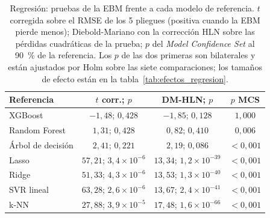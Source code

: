 \begin{table}[tbp]
  \centering\small\setlength{\tabcolsep}{3pt}
  \caption{Regresión: pruebas de la EBM frente a cada modelo de referencia. $t$ corregida sobre el RMSE de los 5 pliegues (positiva cuando la EBM pierde menos); Diebold-Mariano con la corrección HLN sobre las pérdidas cuadráticas de la prueba; $p$ del \emph{Model Confidence Set} al 90~\% de la referencia. Los $p$ de las dos primeras son bilaterales y están ajustados por Holm sobre las siete comparaciones; los tamaños de efecto están en la tabla~\ref{tab:efectos_regresion}.}
  \label{tab:pruebas_regresion}
  \begin{tabular}{@{}l c c c@{}}
    \toprule
    Referencia & $t$ corr.; $p$ & DM-HLN; $p$ & $p$ MCS \\
    \midrule
    XGBoost & $-1{,}48$; $0{,}428$ & $-1{,}85$; $0{,}128$ & $1{,}000$ \\
    Random Forest & $1{,}31$; $0{,}428$ & $0{,}82$; $0{,}410$ & $0{,}006$ \\
    Árbol de decisión & $2{,}41$; $0{,}221$ & $2{,}19$; $0{,}086$ & $<0{,}001$ \\
    Lasso & $57{,}21$; $3{,}4 \times 10^{-6}$ & $13{,}34$; $1{,}2 \times 10^{-39}$ & $<0{,}001$ \\
    Ridge & $51{,}33$; $4{,}3 \times 10^{-6}$ & $13{,}53$; $1{,}3 \times 10^{-40}$ & $<0{,}001$ \\
    SVR lineal & $63{,}28$; $2{,}6 \times 10^{-6}$ & $13{,}67$; $2{,}4 \times 10^{-41}$ & $<0{,}001$ \\
    k-NN & $27{,}88$; $3{,}9 \times 10^{-5}$ & $17{,}48$; $1{,}6 \times 10^{-66}$ & $<0{,}001$ \\
    \bottomrule
  \end{tabular}
\end{table}
